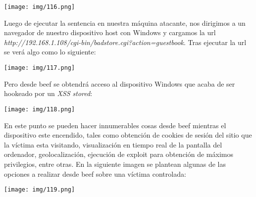 \documentclass[12pt,oneside,a4paper]{book}
\begin{document}
\begin{enumerate}
\vspace{1em}

\begin{center}
    \texttt{[image: img/116.png]}
\end{center}

\vspace{1em}

\hspace{20pt}
Luego de ejecutar la sentencia en nuestra máquina atacante, nos dirigimos a un navegador de nuestro dispositivo host con Windows y cargamos la url \textit{http://192.168.1.108/cgi-bin/badstore.cgi?action=guestbook}. Tras ejecutar la url se verá algo como lo siguiente:

\vspace{1em}

\begin{center}
    \texttt{[image: img/117.png]}
\end{center}

\vspace{1em}

\hspace{20pt}
Pero desde beef se obtendrá acceso al dispositivo Windows que acaba de ser hookeado por un \textit{XSS stored}:

\vspace{1em}

\begin{center}
    \texttt{[image: img/118.png]}
\end{center}

\vspace{1em}

\hspace{20pt}
En este punto se pueden hacer innumerables cosas desde beef mientras el dispositivo este encendido, tales como obtención de cookies de sesión del sitio que la víctima esta visitando, visualización en tiempo real de la pantalla del ordenador, geolocalización, ejecución de exploit para obtención de máximos privilegios, entre otras. En la siguiente imagen se plantean algunas de las opciones a realizar desde beef sobre una víctima controlada:

\vspace{1em}

\begin{center}
    \texttt{[image: img/119.png]}
\end{center}

\vspace{2em}


\end{enumerate}
\end{document}
